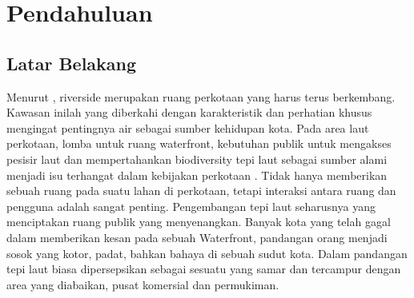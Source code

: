 \documentclass[../projects/thesis.tex]{subfiles}
\begin{document}
\chapter{Pendahuluan}\label{chap:pendahuluan}

\section{Latar Belakang}

Menurut \cite{shamsuddin2013}, riverside merupakan ruang perkotaan yang harus terus berkembang. Kawasan inilah yang diberkahi dengan karakteristik dan perhatian khusus mengingat pentingnya air sebagai sumber kehidupan kota.
Pada area laut perkotaan, lomba untuk ruang waterfront, kebutuhan publik untuk mengakses pesisir laut dan mempertahankan biodiversity tepi laut sebagai sumber alami menjadi isu terhangat dalam kebijakan perkotaan \citep{breen1994waterfronts}.
Tidak hanya memberikan sebuah ruang pada suatu lahan di perkotaan, tetapi interaksi antara ruang dan pengguna adalah sangat penting. Pengembangan tepi laut seharusnya yang menciptakan ruang publik yang menyenangkan. Banyak kota yang telah gagal dalam memberikan kesan pada sebuah Waterfront, pandangan orang menjadi sosok yang kotor, padat, bahkan bahaya di sebuah sudut kota. Dalam pandangan \cite{goodwin1999} tepi laut biasa dipersepsikan sebagai sesuatu yang samar dan tercampur dengan area yang diabaikan, pusat komersial dan permukiman.
\end{document}
